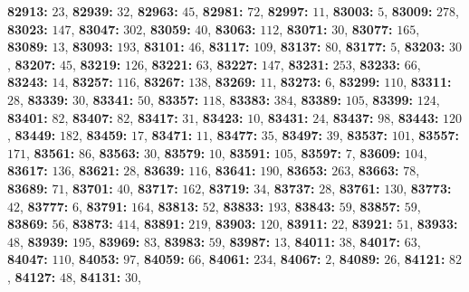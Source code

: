 \textsf{\bfseries 82913:} $23$, \textsf{\bfseries 82939:} $32$, \textsf{\bfseries 82963:} $45$, \textsf{\bfseries 82981:} $72$, \textsf{\bfseries 82997:} $11$, \textsf{\bfseries 83003:} $5$, \textsf{\bfseries 83009:} $278$, \textsf{\bfseries 83023:} $147$, \textsf{\bfseries 83047:} $302$, \textsf{\bfseries 83059:} $40$, \textsf{\bfseries 83063:} $112$, \textsf{\bfseries 83071:} $30$, \textsf{\bfseries 83077:} $165$, \textsf{\bfseries 83089:} $13$, \textsf{\bfseries 83093:} $193$, \textsf{\bfseries 83101:} $46$, \textsf{\bfseries 83117:} $109$, \textsf{\bfseries 83137:} $80$, \textsf{\bfseries 83177:} $5$, \textsf{\bfseries 83203:} $30$, \textsf{\bfseries 83207:} $45$, \textsf{\bfseries 83219:} $126$, \textsf{\bfseries 83221:} $63$, \textsf{\bfseries 83227:} $147$, \textsf{\bfseries 83231:} $253$, \textsf{\bfseries 83233:} $66$, \textsf{\bfseries 83243:} $14$, \textsf{\bfseries 83257:} $116$, \textsf{\bfseries 83267:} $138$, \textsf{\bfseries 83269:} $11$, \textsf{\bfseries 83273:} $6$, \textsf{\bfseries 83299:} $110$, \textsf{\bfseries 83311:} $28$, \textsf{\bfseries 83339:} $30$, \textsf{\bfseries 83341:} $50$, \textsf{\bfseries 83357:} $118$, \textsf{\bfseries 83383:} $384$, \textsf{\bfseries 83389:} $105$, \textsf{\bfseries 83399:} $124$, \textsf{\bfseries 83401:} $82$, \textsf{\bfseries 83407:} $82$, \textsf{\bfseries 83417:} $31$, \textsf{\bfseries 83423:} $10$, \textsf{\bfseries 83431:} $24$, \textsf{\bfseries 83437:} $98$, \textsf{\bfseries 83443:} $120$, \textsf{\bfseries 83449:} $182$, \textsf{\bfseries 83459:} $17$, \textsf{\bfseries 83471:} $11$, \textsf{\bfseries 83477:} $35$, \textsf{\bfseries 83497:} $39$, \textsf{\bfseries 83537:} $101$, \textsf{\bfseries 83557:} $171$, \textsf{\bfseries 83561:} $86$, \textsf{\bfseries 83563:} $30$, \textsf{\bfseries 83579:} $10$, \textsf{\bfseries 83591:} $105$, \textsf{\bfseries 83597:} $7$, \textsf{\bfseries 83609:} $104$, \textsf{\bfseries 83617:} $136$, \textsf{\bfseries 83621:} $28$, \textsf{\bfseries 83639:} $116$, \textsf{\bfseries 83641:} $190$, \textsf{\bfseries 83653:} $263$, \textsf{\bfseries 83663:} $78$, \textsf{\bfseries 83689:} $71$, \textsf{\bfseries 83701:} $40$, \textsf{\bfseries 83717:} $162$, \textsf{\bfseries 83719:} $34$, \textsf{\bfseries 83737:} $28$, \textsf{\bfseries 83761:} $130$, \textsf{\bfseries 83773:} $42$, \textsf{\bfseries 83777:} $6$, \textsf{\bfseries 83791:} $164$, \textsf{\bfseries 83813:} $52$, \textsf{\bfseries 83833:} $193$, \textsf{\bfseries 83843:} $59$, \textsf{\bfseries 83857:} $59$, \textsf{\bfseries 83869:} $56$, \textsf{\bfseries 83873:} $414$, \textsf{\bfseries 83891:} $219$, \textsf{\bfseries 83903:} $120$, \textsf{\bfseries 83911:} $22$, \textsf{\bfseries 83921:} $51$, \textsf{\bfseries 83933:} $48$, \textsf{\bfseries 83939:} $195$, \textsf{\bfseries 83969:} $83$, \textsf{\bfseries 83983:} $59$, \textsf{\bfseries 83987:} $13$, \textsf{\bfseries 84011:} $38$, \textsf{\bfseries 84017:} $63$, \textsf{\bfseries 84047:} $110$, \textsf{\bfseries 84053:} $97$, \textsf{\bfseries 84059:} $66$, \textsf{\bfseries 84061:} $234$, \textsf{\bfseries 84067:} $2$, \textsf{\bfseries 84089:} $26$, \textsf{\bfseries 84121:} $82$, \textsf{\bfseries 84127:} $48$, \textsf{\bfseries 84131:} $30$, 
